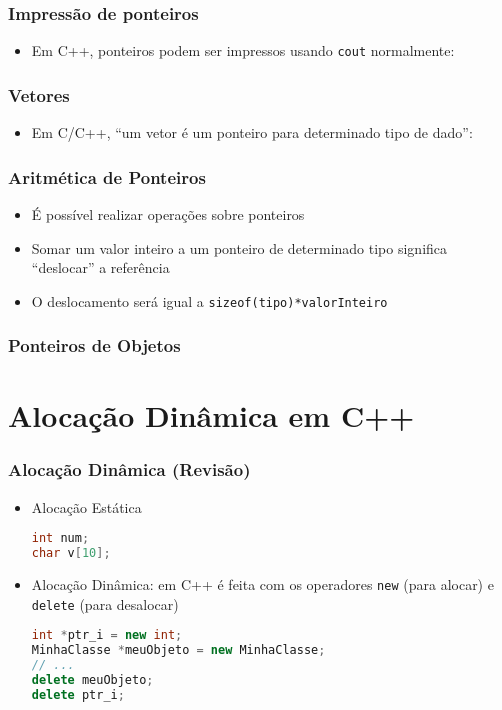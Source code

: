 \documentclass[aspectratio=169]{beamer}
\begin{document}
\begin{frame}[fragile]\frametitle{Impressão de ponteiros}
\begin{itemize}
	\item Em C++, ponteiros podem ser impressos usando \texttt{cout} normalmente:

\end{itemize}
\end{frame}

\begin{frame}[fragile]\frametitle{Vetores}
\begin{itemize}
	\item Em C/C++, ``um vetor é um ponteiro para determinado tipo de dado'':

\end{itemize}
\end{frame}

\begin{frame}[fragile]\frametitle{Aritmética de Ponteiros}
\begin{itemize}
	\item É possível realizar operações sobre ponteiros
	\item Somar um valor inteiro a um ponteiro de determinado tipo significa ``deslocar'' a referência
	\item O deslocamento será igual a \texttt{sizeof(tipo)*valorInteiro}

\end{itemize}
\end{frame}

\begin{frame}[fragile]\frametitle{Ponteiros de Objetos}

\end{frame}

\section{Alocação Dinâmica em C++}

\begin{frame}[fragile]\frametitle{Alocação Dinâmica (Revisão)}
\begin{itemize}
	\item Alocação Estática
\begin{lstlisting}[language=C++]
int num;
char v[10];
\end{lstlisting}
	\item Alocação Dinâmica: em C++ é feita com os operadores \texttt{new} (para alocar) e \texttt{delete} (para desalocar)
\begin{lstlisting}[language=C++]
int *ptr_i = new int;
MinhaClasse *meuObjeto = new MinhaClasse;
// ...
delete meuObjeto;
delete ptr_i;
\end{lstlisting}
\end{itemize}
\end{frame}
\end{document}
